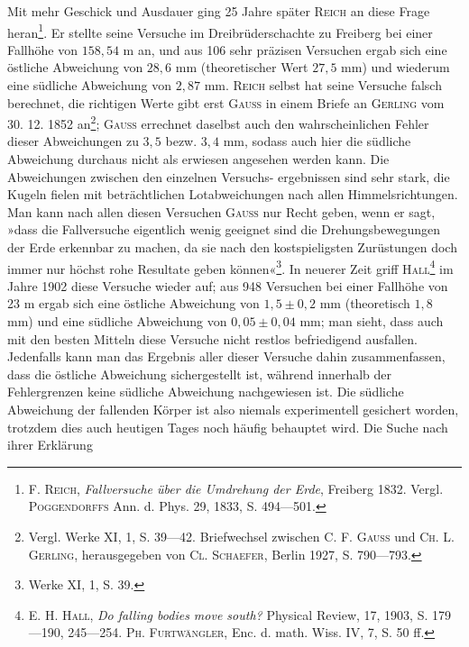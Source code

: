 Mit mehr Geschick und Ausdauer ging 25 Jahre später \textsc{Reich} an diese
Frage heran\footnote{F. \textsc{Reich}, \textit{Fallversuche über die Umdrehung der Erde}, Freiberg 1832. Vergl. \textsc{Poggendorffs} Ann.
d. Phys. 29, 1833, S. 494—501.}. Er stellte seine Versuche im Dreibrüderschachte zu Freiberg
bei einer Fallhöhe von $158{,}54$ m an, und aus 106 sehr präzisen Versuchen
ergab sich eine östliche Abweichung von $28{,}6$ mm (theoretischer Wert $27{,}5$ mm)
und wiederum eine südliche Abweichung von $2{,}87$ mm. \textsc{Reich} selbst hat seine
Versuche falsch berechnet, die richtigen Werte gibt erst \textsc{Gauss} in einem
Briefe an \textsc{Gerling} vom 30. 12. 1852 an\footnote{Vergl. Werke XI, 1, S. 39—42. Briefwechsel zwischen \textsc{C. F. Gauss} und \textsc{Ch. L. Gerling}, herausgegeben
von \textsc{Cl. Schaefer}, Berlin 1927, S. 790—793.}; \textsc{Gauss} errechnet daselbst auch
den wahrscheinlichen Fehler dieser Abweichungen zu $3{,}5$ bezw. $3{,}4$ mm, sodass
auch hier die südliche Abweichung durchaus nicht als erwiesen angesehen
werden kann. Die Abweichungen zwischen den einzelnen Versuchs\nobreakdash-
\clearpage{}
\HistoricalFoot{}{2\textsuperscript{*}}
\noindent ergebnissen sind sehr stark, die Kugeln fielen mit beträchtlichen Lotabweichungen
nach allen Himmelsrichtungen. Man kann nach allen diesen Versuchen \textsc{Gauss}
nur Recht geben, wenn er sagt, »dass die Fallversuche eigentlich wenig geeignet
sind die Drehungsbewegungen der Erde erkennbar zu machen, da sie
nach den kostspieligsten Zurüstungen doch immer nur höchst rohe Resultate
geben können«\footnote{Werke XI, 1, S. 39.}. In neuerer Zeit griff \textsc{Hall}\footnote{E. H. \textsc{Hall}, \textit{Do falling bodies move south?} Physical Review, 17, 1903, S. 179—190, 245—254.
\textsc{Ph. Furtwängler}, Enc. d. math. Wiss. IV, 7, S. 50 ff.} im Jahre 1902 diese Versuche
wieder auf; aus 948 Versuchen bei einer Fallhöhe von 23 m ergab sich eine
östliche Abweichung von $1{,}5\pm0{,}2$ mm (theoretisch $1{,}8$ mm) und eine südliche
Abweichung von $0{,}05\pm0{,}04$ mm; man sieht, dass auch mit den besten Mitteln
diese Versuche nicht restlos befriedigend ausfallen. Jedenfalls kann man das
Ergebnis aller dieser Versuche dahin zusammenfassen, dass die östliche Abweichung
sichergestellt ist, während innerhalb der Fehlergrenzen keine südliche
Abweichung nachgewiesen ist. Die südliche Abweichung der fallenden
Körper ist also niemals experimentell gesichert worden, trotzdem dies auch
heutigen Tages noch häufig behauptet wird. Die Suche nach ihrer Erklärung
